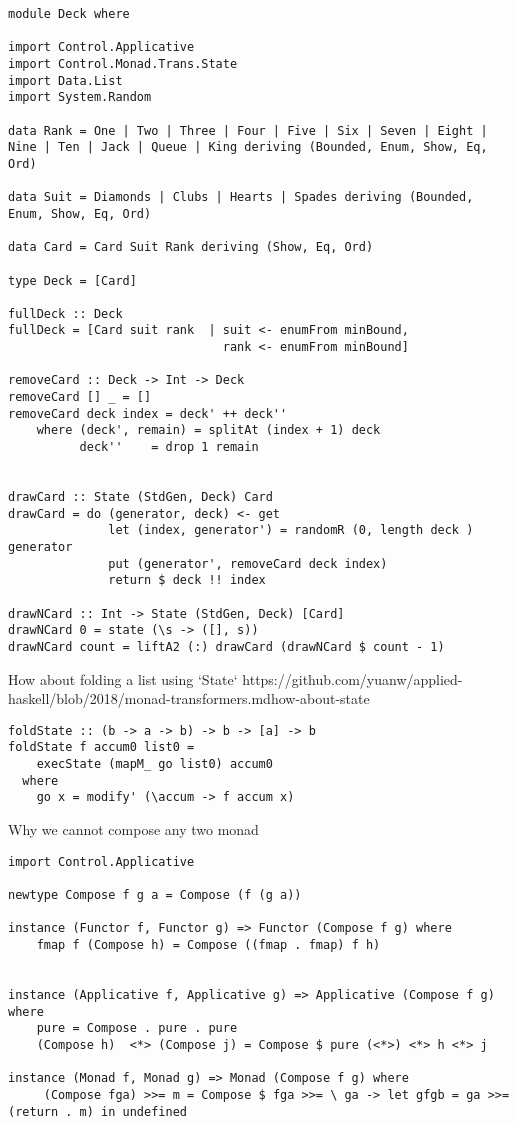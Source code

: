 \begin{verbatim}
module Deck where

import Control.Applicative
import Control.Monad.Trans.State
import Data.List
import System.Random

data Rank = One | Two | Three | Four | Five | Six | Seven | Eight | Nine | Ten | Jack | Queue | King deriving (Bounded, Enum, Show, Eq, Ord)

data Suit = Diamonds | Clubs | Hearts | Spades deriving (Bounded, Enum, Show, Eq, Ord)

data Card = Card Suit Rank deriving (Show, Eq, Ord)

type Deck = [Card]

fullDeck :: Deck
fullDeck = [Card suit rank  | suit <- enumFrom minBound,
                              rank <- enumFrom minBound]

removeCard :: Deck -> Int -> Deck
removeCard [] _ = []
removeCard deck index = deck' ++ deck''
    where (deck', remain) = splitAt (index + 1) deck
          deck''    = drop 1 remain


drawCard :: State (StdGen, Deck) Card
drawCard = do (generator, deck) <- get
              let (index, generator') = randomR (0, length deck ) generator
              put (generator', removeCard deck index)
              return $ deck !! index

drawNCard :: Int -> State (StdGen, Deck) [Card]
drawNCard 0 = state (\s -> ([], s))
drawNCard count = liftA2 (:) drawCard (drawNCard $ count - 1)
\end{verbatim}

How about folding a list using `State`
https://github.com/yuanw/applied-haskell/blob/2018/monad-transformers.mdhow-about-state


\begin{verbatim}
foldState :: (b -> a -> b) -> b -> [a] -> b
foldState f accum0 list0 =
    execState (mapM_ go list0) accum0
  where
    go x = modify' (\accum -> f accum x)
\end{verbatim}


Why we cannot compose any two monad

\begin{verbatim}
import Control.Applicative

newtype Compose f g a = Compose (f (g a))

instance (Functor f, Functor g) => Functor (Compose f g) where
    fmap f (Compose h) = Compose ((fmap . fmap) f h)


instance (Applicative f, Applicative g) => Applicative (Compose f g) where
    pure = Compose . pure . pure
    (Compose h)  <*> (Compose j) = Compose $ pure (<*>) <*> h <*> j

instance (Monad f, Monad g) => Monad (Compose f g) where
     (Compose fga) >>= m = Compose $ fga >>= \ ga -> let gfgb = ga >>= (return . m) in undefined
\end{verbatim}


